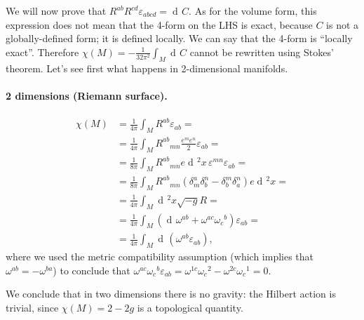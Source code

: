 \documentclass[a4paper,12pt]{book}
\newcommand{\dd}{\mathop{\mathrm{d}\!}{}}
\renewcommand{\epsilon}{\varepsilon}
\theoremstyle{definition}
\theoremstyle{remark}
\begin{document}
We will now prove that $R^{ab}R^{cd}\epsilon_{abcd}=\dd C$. As for the volume form, this expression does not mean that the 4-form on the LHS is exact, because $C$ is not a globally-defined form; it is defined locally. We can say that the 4-form is ``locally exact''. Therefore $\chi(M)=-\frac1{32\pi^2}\int_M\dd C$ cannot be rewritten using Stokes' theorem. Let's see first what happens in 2-dimensional manifolds.
\paragraph{2 dimensions (Riemann surface).}
\begin{align*}
\chi(M)&=\frac1{4\pi}\int_MR^{ab}\epsilon_{ab}=\\
&=\frac1{4\pi}\int_MR^{ab}{}_{mn}\frac{e^me^n}{2}\epsilon_{ab}=\\
&=\frac1{8\pi}\int_MR^{ab}{}_{mn}e\dd^2x\,\epsilon^{mn}\epsilon_{ab}=\\
&=\frac1{8\pi}\int_MR^{ab}{}_{mn}(\delta^a_m\delta^n_b-\delta^m_b\delta^n_a)e\dd^2x=\\
&=\frac1{4\pi}\int_M\dd^2x\sqrt{-g}R=\\
&=\frac1{4\pi}\int_M(\dd\omega^{ab}+\omega^{ac}\omega_c{}^b)\epsilon_{ab}=\\
&=\frac1{4\pi}\int_M\dd(\omega^{ab}\epsilon_{ab}),
\end{align*}
where we used the metric compatibility assumption (which implies that $\omega^{ab}=-\omega^{ba}$) to conclude that $\omega^{ac}\omega_c{}^b\epsilon_{ab}=\omega^{1c}\omega_c{}^2-\omega^{2c}\omega_c{}^1=0$.

We conclude that in two dimensions there is no gravity: the Hilbert action is trivial, since $\chi(M)=2-2g$ is a topological quantity.
\end{document}
